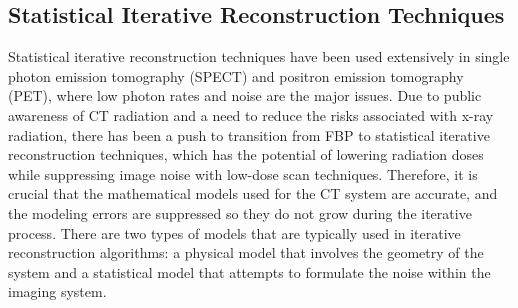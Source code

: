 \subsection{Statistical Iterative Reconstruction Techniques}
Statistical iterative reconstruction techniques have been used extensively in single photon emission tomography (SPECT) and positron emission tomography (PET), where low photon rates and noise are the major issues.  Due to public awareness of CT radiation and a need to reduce the risks associated with x-ray radiation, there has been a push to transition from FBP to statistical iterative reconstruction techniques, which has the potential of lowering radiation doses while suppressing image noise with low-dose scan techniques.  Therefore, it is crucial that the mathematical models used for the CT system are accurate, and the modeling errors are suppressed so they do not grow during the iterative process.  There are two types of models that are typically used in iterative reconstruction algorithms: a physical model that involves the geometry of the system and a statistical model that attempts to formulate the noise within the imaging system.


